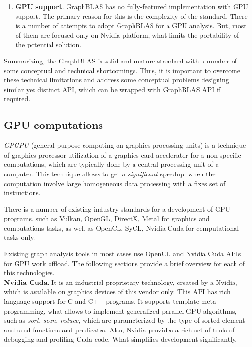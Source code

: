 \begin{enumerate}
\item \textbf{GPU support}\label{issue6}. GraphBLAS has no fully-featured implementation with GPU support. The primary reason for this is the complexity of the standard. There is a number of attempts to adopt GraphBLAS for a GPU analysis. But, most of them are focused only on Nvidia platform, what limits the portability of the potential solution.

\end{enumerate}

Summarizing, the GraphBLAS is solid and mature standard with a number of some conceptual and technical shortcomings. Thus, it is important to overcome these technical limitations and address some conceptual problems designing similar yet distinct API, which can be wrapped with GraphBLAS API if required.

\subsection{GPU computations}

\textit{GPGPU} (general-purpose computing on graphics processing units) is a technique of graphics processor utilization of a graphics card accelerator for a non-specific computations, which are typically done by a central processing unit of a computer. This technique allows to get a \textit{significant} speedup, when the computation involve large homogeneous data processing with a fixes set of instructions.

There is a number of existing industry standards for a development of GPU programs, such as Vulkan, OpenGL, DirectX, Metal for graphics and computations tasks, as well as OpenCL, SyCL, Nvidia Cuda for computational tasks only.

Existing graph analysis tools in most cases use OpenCL and Nvidia Cuda APIs for GPU work offload. The following sections provide a brief overview for each of this technologies.\\

\textbf{Nvidia Cuda}. It is an industrial proprietary technology, created by a Nvidia, which is available on graphics devices of this vendor only. This API has rich language support for C and C++ programs. It supports template meta programming, what allows to implement generalized parallel GPU algorithms, such as \textit{sort}, \textit{scan}, \textit{reduce}, which are parameterized by the type of sorted element and used functions and predicates. Also, Nvidia provides a rich set of tools of debugging and profiling Cuda code. What simplifies development significantly.\\

